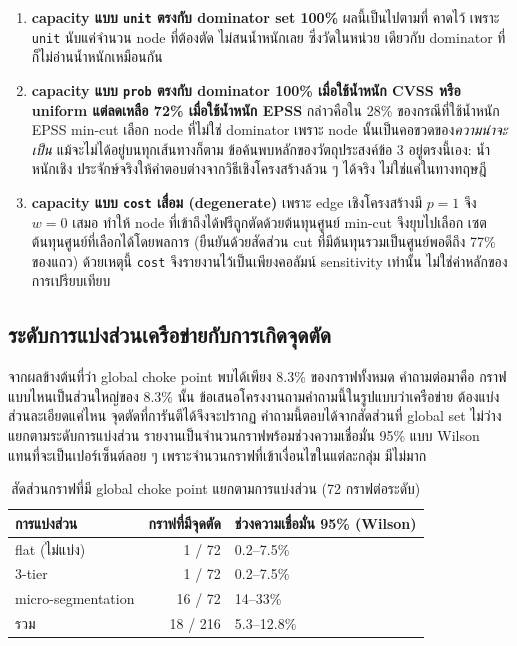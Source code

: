 \begin{enumerate}[leftmargin=1.6em]
\item \textbf{capacity แบบ \texttt{unit} ตรงกับ dominator set 100\%} ผลนี้เป็นไปตามที่
คาดไว้ เพราะ \texttt{unit} นับแค่จำนวน node ที่ต้องตัด ไม่สนน้ำหนักเลย ซึ่งวัดในหน่วย
เดียวกับ dominator ที่ก็ไม่อ่านน้ำหนักเหมือนกัน
\item \textbf{capacity แบบ \texttt{prob} ตรงกับ dominator 100\% เมื่อใช้น้ำหนัก CVSS หรือ
uniform แต่ลดเหลือ 72\% เมื่อใช้น้ำหนัก EPSS} กล่าวคือใน 28\% ของกรณีที่ใช้น้ำหนัก EPSS
min-cut เลือก node ที่ไม่ใช่ dominator เพราะ node นั้นเป็นคอขวดของ\emph{ความน่าจะเป็น}
แม้จะไม่ได้อยู่บนทุกเส้นทางก็ตาม ข้อค้นพบหลักของวัตถุประสงค์ข้อ 3 อยู่ตรงนี้เอง: น้ำหนักเชิง
ประจักษ์จริงให้คำตอบต่างจากวิธีเชิงโครงสร้างล้วน ๆ ได้จริง ไม่ใช่แค่ในทางทฤษฎี
\item \textbf{capacity แบบ \texttt{cost} เสื่อม (degenerate)} เพราะ edge เชิงโครงสร้างมี
$p=1$ จึง $w=0$ เสมอ ทำให้ node ที่เข้าถึงได้ฟรีถูกตัดด้วยต้นทุนศูนย์ min-cut จึงยุบไปเลือก
เซตต้นทุนศูนย์ที่เลือกได้โดยพลการ (ยืนยันด้วยสัดส่วน cut ที่มีต้นทุนรวมเป็นศูนย์พอดีถึง
77\% ของแถว) ด้วยเหตุนี้ \texttt{cost} จึงรายงานไว้เป็นเพียงคอลัมน์ sensitivity เท่านั้น
ไม่ใช่ค่าหลักของการเปรียบเทียบ
\end{enumerate}

\subsection{ระดับการแบ่งส่วนเครือข่ายกับการเกิดจุดตัด}\label{sec:eval-cut-segmentation}

จากผลข้างต้นที่ว่า global choke point พบได้เพียง 8.3\% ของกราฟทั้งหมด คำถามต่อมาคือ
กราฟแบบไหนเป็นส่วนใหญ่ของ 8.3\% นั้น ข้อเสนอโครงงานถามคำถามนี้ในรูปแบบว่าเครือข่าย
ต้องแบ่งส่วนละเอียดแค่ไหน จุดตัดที่การันตีได้จึงจะปรากฏ คำถามนี้ตอบได้จากสัดส่วนที่
global set ไม่ว่าง แยกตามระดับการแบ่งส่วน รายงานเป็นจำนวนกราฟพร้อมช่วงความเชื่อมั่น
95\% แบบ Wilson แทนที่จะเป็นเปอร์เซ็นต์ลอย ๆ เพราะจำนวนกราฟที่เข้าเงื่อนไขในแต่ละกลุ่ม
มีไม่มาก

\begin{table}[H]
\centering
\caption{สัดส่วนกราฟที่มี global choke point แยกตามการแบ่งส่วน (72 กราฟต่อระดับ)}\label{tab:seg}
\small
\begin{tabular}{lrl}
\toprule
การแบ่งส่วน & กราฟที่มีจุดตัด & ช่วงความเชื่อมั่น 95\% (Wilson) \\
\midrule
flat (ไม่แบ่ง) & 1 / 72 & 0.2--7.5\% \\
3-tier & 1 / 72 & 0.2--7.5\% \\
micro-segmentation & 16 / 72 & 14--33\% \\
\midrule
รวม & 18 / 216 & 5.3--12.8\% \\
\bottomrule
\end{tabular}
\end{table}

